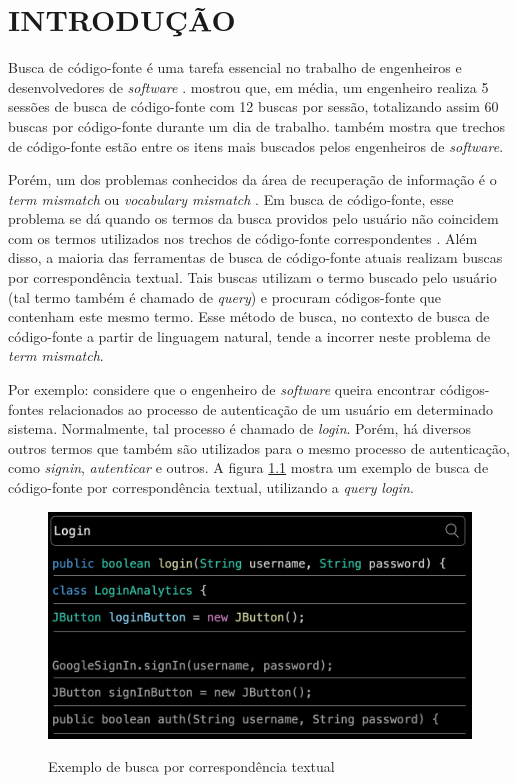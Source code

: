 \chapter{INTRODUÇÃO}
\label{chp:introduction}


Busca de código-fonte é uma tarefa essencial no trabalho de engenheiros e desenvolvedores de \textit{software} \cite{Rahman2018EvaluatingHD}. \textcite{Sadowski2015HowDS} mostrou que, em média, um engenheiro realiza 5 sessões de busca de código-fonte com 12 buscas por sessão, totalizando assim 60 buscas por código-fonte durante um dia de trabalho. \textcite{Xia2017WhatDD} também mostra que trechos de código-fonte estão entre os itens mais buscados pelos engenheiros de \textit{software}.

Porém, um dos problemas conhecidos da área de recuperação de informação é o \textit{term mismatch} ou \textit{vocabulary mismatch} \cite{Furnas1987TheVP} \cite{Carpineto2012ASO}. Em busca de código-fonte, esse problema se dá quando os termos da busca providos pelo usuário não coincidem com os termos utilizados nos trechos de código-fonte correspondentes \cite{Nie2016QueryEB}. Além disso, a maioria das ferramentas de busca de código-fonte atuais realizam buscas por correspondência textual. Tais buscas utilizam o termo buscado pelo usuário (tal termo também é chamado de \textit{query}) e procuram códigos-fonte que contenham este mesmo termo. Esse método de busca, no contexto de busca de código-fonte a partir de linguagem natural, tende a incorrer neste problema de \textit{term mismatch}.

Por exemplo: considere que o engenheiro de \textit{software} queira encontrar códigos-fontes relacionados ao processo de autenticação de um usuário em determinado sistema. Normalmente, tal processo é chamado de \textit{login}. Porém, há diversos outros termos que também são utilizados para o mesmo processo de autenticação, como \textit{signin}, \textit{autenticar} e outros. A figura \ref{fig:intro:login-search} mostra um exemplo de busca de código-fonte por correspondência textual, utilizando a \textit{query} \textit{login}.

\begin{figure}[H]
  \centering
  \caption{Exemplo de busca por correspondência textual}
  \includegraphics[width=\textwidth,keepaspectratio=true]{resources/images/introducao/login-search.png}
  \label{fig:intro:login-search}
\end{figure}

